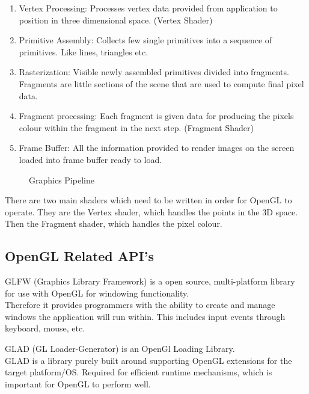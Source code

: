 \documentclass{report}
\begin{document}
\begin{enumerate}
	\item Vertex Processing: Processes vertex data provided from application to position in three dimensional space. (Vertex Shader)
	\item Primitive Assembly: Collects few single primitives into a sequence of primitives. Like lines, triangles etc.
	\item Rasterization: Visible newly assembled primitives divided into fragments. Fragments are little sections of the scene that are used to compute final pixel data.
	\item Fragment processing: Each fragment is given data for producing the pixels colour within the fragment in the next step. (Fragment Shader)
	\item Frame Buffer: All the information provided to render images on the screen loaded into frame buffer ready to load.
\end{enumerate}
\citep{KhronosGroupPipeline}

\vspace{0.8cm}
\begin{figure}
\label{fgr:gp}
\centerline{}
\caption[Graphics Pipeline]{}
\centerline{Graphics Pipeline}
\end{figure}

\vspace{0.8cm}

There are two main shaders which need to be written in order for OpenGL to operate. They are the Vertex shader, which handles the points in the 3D space. Then the Fragment shader, which handles the pixel colour.

\subsection{OpenGL Related API's}
GLFW (Graphics Library Framework) is a open source, multi-platform library for use with OpenGL for windowing functionality.\\
Therefore it provides programmers with the ability to create and manage windows the application will run within. This includes input events through keyboard, mouse, etc.\\
\citep{GLFW}

GLAD (GL Loader-Generator) is an OpenGl Loading Library.\\
GLAD is a library purely built around supporting OpenGL extensions for the target platform/OS. Required for efficient runtime mechanisms, which is important for OpenGL to perform well.\\
\citep{GLAD}
\end{document}
